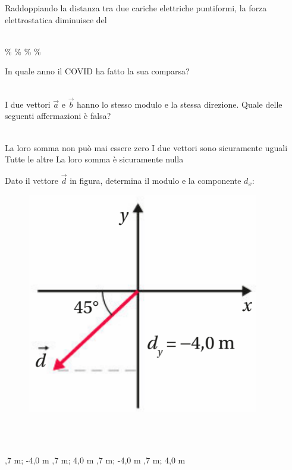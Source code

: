 \documentclass[a4paper,11pt]{exam}
\begin{document}
\begin{questions}
    
\question Raddoppiando la distanza tra due cariche elettriche puntiformi, la forza elettrostatica diminuisce del\\\
\begin{oneparchoices}
  \%
  \%
  \%
  \%
\end{oneparchoices}

    
\question In quale anno il COVID ha fatto la sua comparsa?\\\
\begin{oneparchoices}
  \choice 2019
\end{oneparchoices}

    
\question I due vettori $\vec{a}$ e $\vec{b}$ hanno lo stesso modulo e la stessa direzione. Quale delle seguenti affermazioni è falsa?\\\
\begin{oneparchoices}
  \choice La loro somma non può mai essere zero
  \choice I due vettori sono sicuramente uguali
  \choice Tutte le altre
  \choice La loro somma è sicuramente nulla
\end{oneparchoices}

    
\question Dato il vettore $\vec{d}$ in figura, determina il modulo e la componente $d_x$: \begin{figure}[h!]   \begin{center}     \includegraphics[scale=0.35]{vettored.png}   \end{center} \end{figure}\\\
\begin{oneparchoices}
  \choice 5,7 m; -4,0 m
  ,7 m; 4,0 m
  \choice -5,7 m; -4,0 m
  \choice -5,7 m; 4,0 m
\end{oneparchoices}


\end{questions}
\end{document}
